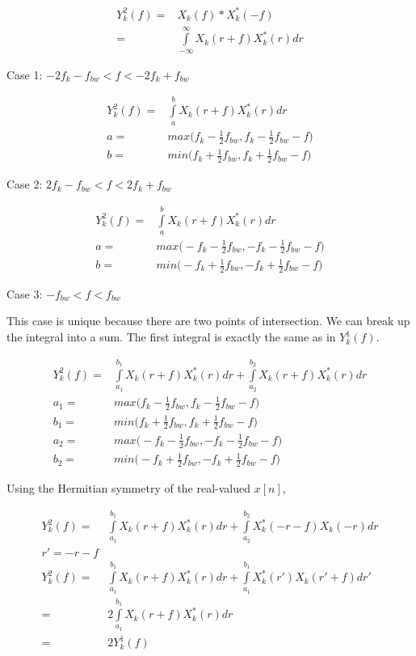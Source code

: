 \documentclass [11pt, proquest,oneside] {ganter_thesis}[2015/03/03]
\begin{document}
\begin{align}
Y_{k}^2(f) =& X_{k}(f) * X_{k}^*(-f) \\
=& \int\limits_{-\infty}^{\infty} X_{k}(r + f) X_{k}^*(r)dr
\end{align}

Case 1: $-2f_k - f_{bw} < f < -2f_k + f_{bw}$

\begin{align}
Y_{k}^2(f) =& \int\limits_{a}^{b} X_{k}(r + f) X_{k}^*(r)dr \\
a =& max\Big( f_k - \frac{1}{2} f_{bw},  f_k - \frac{1}{2} f_{bw} - f\Big) \\
b =& min\Big( f_k + \frac{1}{2} f_{bw},  f_k + \frac{1}{2} f_{bw} - f\Big)
\end{align}

Case 2: $2f_k - f_{bw} < f < 2f_k + f_{bw}$

\begin{align}
Y_{k}^2(f) =& \int\limits_{a}^{b} X_{k}(r + f) X_{k}^*(r)dr \\
a =& max\Big( -f_k - \frac{1}{2} f_{bw},  -f_k - \frac{1}{2} f_{bw} - f\Big) \\
b =& min\Big( -f_k + \frac{1}{2} f_{bw},  -f_k + \frac{1}{2} f_{bw} - f\Big)
\end{align}

Case 3: $- f_{bw} < f < f_{bw}$

This case is unique because there are two points of intersection.  We can break up the integral into a sum.  The first integral is exactly the same as in $Y^1_k(f)$.

\begin{align}
Y_{k}^2(f) =& \int\limits_{a_1}^{b_1} X_{k}(r + f) X_{k}^*(r)dr + \int\limits_{a_2}^{b_2} X_{k}(r + f) X_{k}^*(r)dr \\
a_1 =& max\Big( f_k - \frac{1}{2} f_{bw},  f_k - \frac{1}{2} f_{bw} - f\Big) \\
b_1 =& min\Big( f_k + \frac{1}{2} f_{bw},  f_k + \frac{1}{2} f_{bw} - f\Big) \\
a_2 =& max\Big( -f_k - \frac{1}{2} f_{bw},  -f_k - \frac{1}{2} f_{bw} - f\Big) \\
b_2 =& min\Big( -f_k + \frac{1}{2} f_{bw},  -f_k + \frac{1}{2} f_{bw} - f\Big)
\end{align}

Using the Hermitian symmetry of the real-valued $x[n]$,

\begin{align}
Y_{k}^2(f) =& \int\limits_{a_1}^{b_1} X_{k}(r + f) X_{k}^*(r)dr + \int\limits_{a_2}^{b_2} X_{k}^*(-r - f) X_{k}(-r)dr \\
r' = -r - f \nonumber \\
Y_{k}^2(f) =& \int\limits_{a_1}^{b_1} X_{k}(r + f) X_{k}^*(r)dr + \int\limits_{a_1}^{b_1} X_{k}^*(r') X_{k}(r' + f)dr' \\
=& 2 \int\limits_{a_1}^{b_1} X_{k}(r + f) X_{k}^*(r)dr \\
=& 2 Y_k^1(f)
\end{align}
\end{document}
